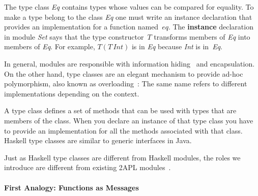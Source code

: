 \documentclass[a4paper,12pt,oneside,fleqn]{book} %
\begin{document}

The type class \textit{Eq} contains types whose values can be compared for
equality. To make a type belong to the class \textit{Eq} one must write an
instance declaration that provides an implementation for a function
named~$eq$. The \textbf{instance} declaration in module \textit{Set} says
that the type constructor~$T$ transforms members of \textit{Eq} into
members of \textit{Eq}. For example, $T(T\,\mathit{Int})$ is in \textit{Eq}
because \textit{Int} is in~\textit{Eq}.

In general, modules are responsible with information
hiding~\cite{DBLP:journals/cacm/Parnas72a} and encapsulation.  On the other
hand, type classes are an elegant mechanism to provide ad-hoc polymorphism,
also known as overloading~\cite{DBLP:conf/popl/WadlerB89}: The same name
refers to different implementations depending on the context.

A type class defines a set of methods that can be used with types that are
members of the class. When you declare an instance of that type class
you have to provide an implementation for all the methods associated with
that class. Haskell type classes are similar to generic interfaces in Java.

Just as Haskell type classes are different from Haskell modules, the roles
we introduce are different from existing 2APL
modules~\cite{dblp:conf/prima/dastanims08}.

\paragraph{First Analogy: Functions as Messages} %
\end{document}

